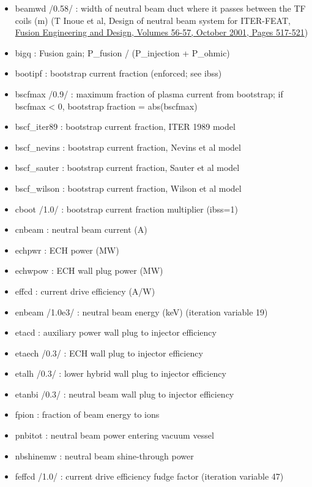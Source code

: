 \documentclass[]{article}
\providecommand{\tightlist}{%
  \setlength{\itemsep}{0pt}\setlength{\parskip}{0pt}}
\begin{document}
\begin{itemize}
\tightlist
\item
  beamwd /0.58/ : width of neutral beam duct where it passes between the
  TF coils (m) (T Inoue et al, Design of neutral beam system for
  ITER-FEAT,
  \href{http://dx.doi.org/10.1016/S0920-3796(01)00339-8}{Fusion
  Engineering and Design, Volumes 56-57, October 2001, Pages 517-521})
\item
  bigq : Fusion gain; P\_fusion / (P\_injection + P\_ohmic)
\item
  bootipf : bootstrap current fraction (enforced; see ibss)
\item
  bscfmax /0.9/ : maximum fraction of plasma current from bootstrap; if
  bscfmax \textless{} 0, bootstrap fraction = abs(bscfmax)
\item
  bscf\_iter89 : bootstrap current fraction, ITER 1989 model
\item
  bscf\_nevins : bootstrap current fraction, Nevins et al model
\item
  bscf\_sauter : bootstrap current fraction, Sauter et al model
\item
  bscf\_wilson : bootstrap current fraction, Wilson et al model
\item
  cboot /1.0/ : bootstrap current fraction multiplier (ibss=1)
\item
  cnbeam : neutral beam current (A)
\item
  echpwr : ECH power (MW)
\item
  echwpow : ECH wall plug power (MW)
\item
  effcd : current drive efficiency (A/W)
\item
  enbeam /1.0e3/ : neutral beam energy (keV) (iteration variable 19)
\item
  etacd : auxiliary power wall plug to injector efficiency
\item
  etaech /0.3/ : ECH wall plug to injector efficiency
\item
  etalh /0.3/ : lower hybrid wall plug to injector efficiency
\item
  etanbi /0.3/ : neutral beam wall plug to injector efficiency
\item
  fpion : fraction of beam energy to ions
\item
  pnbitot : neutral beam power entering vacuum vessel
\item
  nbshinemw : neutral beam shine-through power
\item
  feffcd /1.0/ : current drive efficiency fudge factor (iteration
  variable 47)

\end{itemize}
\end{document}
